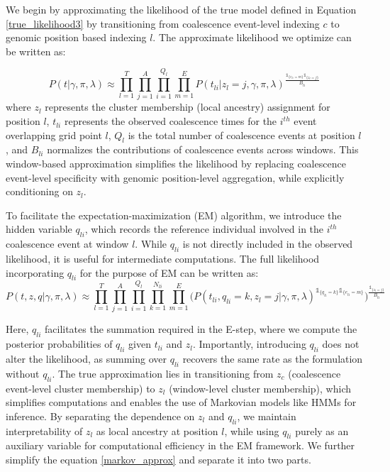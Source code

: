 We begin by approximating the likelihood of the true model defined in Equation \ref{true_likelihood3} by transitioning from coalescence event-level indexing \( c \) to genomic position based indexing \( l \). The approximate likelihood we optimize can be written as:

\begin{equation}
    P(t \vert \gamma, \pi, \lambda) \approx \prod_{l=1}^{T} \prod_{j = 1}^A \prod_{i=1}^{Q_l} \prod_{m=1}^{E} P(t_{li} \vert z_l = j, \gamma, \pi, \lambda)^{\frac{\mathds{1}_{\{e_{l i} = m\}}\mathds{1}_{\{z_l = j\}}}{B_{li}}}
    \label{approx_likelihood_start}
\end{equation}
where \( z_l \) represents the cluster membership (local ancestry) assignment for position \( l \), \( t_{li} \) represents the observed coalescence times for the \( i^{th} \) event overlapping grid point \( l \), \( Q_l \) is the total number of coalescence events at position $l$, and \( B_{li} \) normalizes the contributions of coalescence events across windows. This window-based approximation simplifies the likelihood by replacing coalescence event-level specificity with genomic position-level aggregation, while explicitly conditioning on \( z_l \).

To facilitate the expectation-maximization (EM) algorithm, we introduce the hidden variable \( q_{li} \), which records the reference individual involved in the \( i^{th} \) coalescence event at window \( l \). While \( q_{li} \) is not directly included in the observed likelihood, it is useful for intermediate computations. The full likelihood incorporating \( q_{li} \) for the purpose of EM can be written as:
\begin{equation}
    P (t,z,q \vert \gamma, \pi, \lambda) \approx \prod_{l =1}^{T} \prod_{j = 1}^A \prod_{i = 1}^{Q_l} \prod_{k =1}^{N_{li}} \prod_{m = 1}^E \Big( P(t_{li}, q_{li} = k, z_l = j \vert \gamma, \pi, \lambda) ^ {\mathds{1}_{\{q_{l i} = k\}}  \mathds{1}_{\{e_{l i} = m\}}} \Big) ^{\frac{\mathds{1}_{\{z_l = j\}}}{B_{li}}}
    \label{markov_approx}
\end{equation}

Here, \( q_{li} \) facilitates the summation required in the E-step, where we compute the posterior probabilities of \( q_{li} \) given \( t_{li} \) and \( z_l \). Importantly, introducing \( q_{li} \) does not alter the likelihood, as summing over \( q_{li} \) recovers the same rate as the formulation without \( q_{li} \). The true approximation lies in transitioning from \( z_c \) (coalescence event-level cluster membership) to \( z_l \) (window-level cluster membership), which simplifies computations and enables the use of Markovian models like HMMs for inference. By separating the dependence on \( z_l \) and \( q_{li} \), we maintain interpretability of \( z_l \) as local ancestry at position \( l \), while using \( q_{li} \) purely as an auxiliary variable for computational efficiency in the EM framework. We further simplify the equation \ref{markov_approx} and separate it into two parts.

